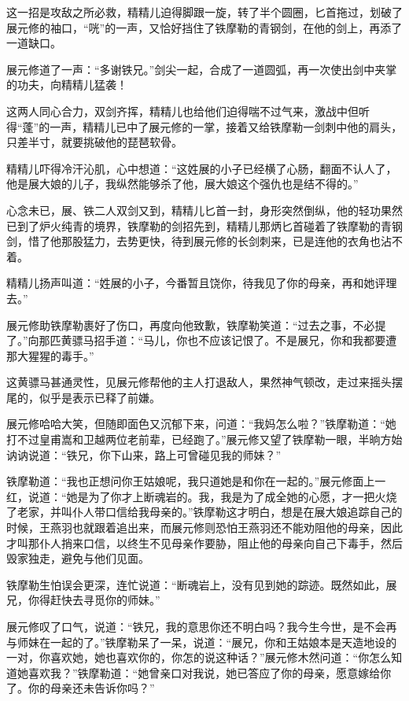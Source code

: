 \documentclass[12pt,oneside]{book}
\begin{document}
这一招是攻敌之所必救，精精儿迫得脚跟一旋，转了半个圆圈，匕首拖过，划破了展元修的袖口，``咣''的一声，又恰好挡住了铁摩勒的青钢剑，在他的剑上，再添了一道缺口。

展元修道了一声：``多谢铁兄。''剑尖一起，合成了一道圆弧，再一次使出剑中夹掌的功夫，向精精儿猛袭！

这两人同心合力，双剑齐挥，精精儿也给他们迫得喘不过气来，激战中但听得``蓬''的一声，精精儿已中了展元修的一掌，接着又给铁摩勒一剑刺中他的肩头，只差半寸，就要挑破他的琵琶软骨。

精精儿吓得冷汗沁肌，心中想道：``这姓展的小子已经横了心肠，翻面不认人了，他是展大娘的儿子，我纵然能够杀了他，展大娘这个强仇也是结不得的。''

心念未已，展、铁二人双剑又到，精精儿匕首一封，身形突然倒纵，他的轻功果然已到了炉火纯青的境界，铁摩勒的剑招先到，精精儿那炳匕首碰着了铁摩勒的青钢剑，惜了他那股猛力，去势更快，待到展元修的长剑刺来，已是连他的衣角也沾不着。

精精儿扬声叫道：``姓展的小子，今番暂且饶你，待我见了你的母亲，再和她评理去。''

展元修助铁摩勒裹好了伤口，再度向他致歉，铁摩勒笑道：``过去之事，不必提了。''向那匹黄骠马招手道：``马儿，你也不应该记恨了。不是展兄，你和我都要遭那大猩猩的毒手。''

这黄骠马甚通灵性，见展元修帮他的主人打退敌人，果然神气顿改，走过来摇头摆尾的，似乎是表示已释了前嫌。

展元修哈哈大笑，但随即面色又沉郁下来，问道：``我妈怎么啦？''铁摩勒道：``她打不过皇甫嵩和卫越两位老前辈，已经跑了。''展元修又望了铁摩勒一眼，半晌方始讷讷说道：``铁兄，你下山来，路上可曾碰见我的师妹？''

铁摩勒道：``我也正想问你王姑娘呢，我只道她是和你在一起的。''展元修面上一红，说道：``她是为了你才上断魂岩的。我，我是为了成全她的心愿，才一把火烧了老家，并叫仆人带口信给我母亲的。''铁摩勒这才明白，想是在展大娘追踪自己的时候，王燕羽也就跟着追出来，而展元修则恐怕王燕羽还不能劝阻他的母亲，因此才叫那仆人捎来口信，以终生不见母亲作要胁，阻止他的母亲向自己下毒手，然后毁家独走，避免与他们见面。

铁摩勒生怕误会更深，连忙说道：``断魂岩上，没有见到她的踪迹。既然如此，展兄，你得赶快去寻觅你的师妹。''

展元修叹了口气，说道：``铁兄，我的意思你还不明白吗？我今生今世，是不会再与师妹在一起的了。''铁摩勒呆了一呆，说道：``展兄，你和王姑娘本是天造地设的一对，你喜欢她，她也喜欢你的，你怎的说这种话？''展元修木然问道：``你怎么知道她喜欢我？''铁摩勒道：``她曾亲口对我说，她已答应了你的母亲，愿意嫁给你了。你的母亲还未告诉你吗？''
\end{document}
